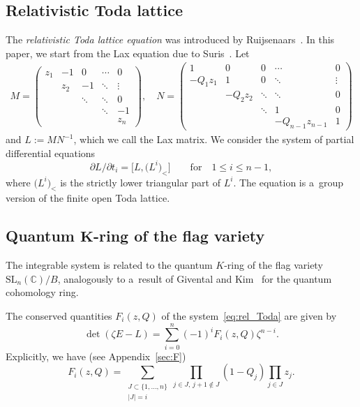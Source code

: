 \documentclass[pdftex]{sigma}
\numberwithin{equation}{section}
\newcommand{\C}{\mathbb{C}}
\newcommand{\SL}{\mathrm{SL}}
\theoremstyle{definition}
\begin{document}
\subsection{Relativistic Toda lattice}\label{sec:Rel Toda}
The \emph{relativistic Toda lattice equation}
was introduced by Ruijsenaars~\cite{Rui}.
In this paper, we start from the Lax equation due to Suris~\cite{Suris}.
Let
\begin{align}\label{eq:def_of_M_and_Q}
M=\begin{pmatrix}
z_1 & -1 & 0 & \cdots &0\\
 & z_2 & -1 & \ddots &\vdots\\
 & & \ddots & \ddots & 0\\
 & & &\ddots & -1\\
 & & & & z_n
\end{pmatrix},\quad
N=\begin{pmatrix}
1 & 0 & 0 & \cdots &0\\
-Q_1z_1 & 1 & 0 & \ddots &\vdots\\
 & -Q_2z_2 & \ddots & \ddots & 0\\
 & & \ddots&1& 0\\
 & & &-Q_{n-1}z_{n-1} & 1
\end{pmatrix}
\end{align}
and $L:=MN^{-1}$, which we call the Lax matrix.
We consider the system of partial differential equations
\begin{equation}\label{eq:rel_Toda}
{\partial L}/{\partial t_i}=\big[L,\bigl(L^i\bigr)_{<}\big]\qquad\text{for}\quad 1\le i\le n-1,
\end{equation}
where $\bigl(L^i\bigr)_{<}$ is the
strictly lower triangular part of $L^i$.
The equation is a~group version of the finite open Toda lattice.



\subsection[Quantum K-ring of the flag variety]{Quantum $\boldsymbol{K}$-ring of the flag variety}\label{sec:QK}
The integrable system is related to the quantum
$K$-ring of the flag variety $\SL_n(\C)/B$, analogously to a~result of
Givental and Kim~\cite{GK} for the quantum cohomology ring.

The conserved quantities $F_i(z,Q)$
of the system~\eqref{eq:rel_Toda} are given by
\[
\det(\zeta E-L)=\sum_{i=0}^n(-1)^i F_i(z,Q)\zeta^{n-i}.
\]
Explicitly, we have (see Appendix~\ref{sec:F})
\begin{equation}\label{eq:polynomialF}
F_i(z,Q)=
\sum_{\substack{J\subset \{1,\dots,n\}\\ |J|=i}}
\prod_{{j\in J,\, j+1\notin J}}(1-Q_j)\prod_{j\in J}z_j.
\end{equation}
\end{document}
